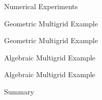 \documentclass{beamer}
\begin{document}
\begin{frame}{Numerical Experiments}

\end{frame}

\begin{frame}{Geometric Multigrid Example}

\end{frame}

\begin{frame}{Geometric Multigrid Example}

\end{frame}

\begin{frame}{Algebraic Multigrid Example}

\end{frame}

\begin{frame}{Algebraic Multigrid Example}

\end{frame}

\begin{frame}{Summary}

\end{frame}

\end{document}
